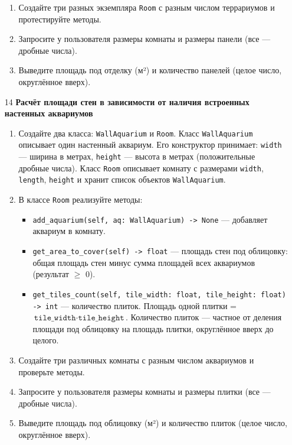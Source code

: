 \begin{enumerate}
\begin{enumerate}
    \item Создайте три разных экземпляра \texttt{Room} с разным числом террариумов и протестируйте методы.

    \item Запросите у пользователя размеры комнаты и размеры панели (все — дробные числа).

    \item Выведите площадь под отделку (м²) и количество панелей (целое число, округлённое вверх).
\end{enumerate}

\item[14] \textbf{Расчёт площади стен в зависимости от наличия встроенных настенных аквариумов}
\begin{enumerate}
    \item Создайте два класса: \texttt{WallAquarium} и \texttt{Room}.  
    Класс \texttt{WallAquarium} описывает один настенный аквариум. Его конструктор принимает:  
    \texttt{width} — ширина в метрах,  
    \texttt{height} — высота в метрах (положительные дробные числа).  
    Класс \texttt{Room} описывает комнату с размерами \texttt{width}, \texttt{length}, \texttt{height} и хранит список объектов \texttt{WallAquarium}.

    \item В классе \texttt{Room} реализуйте методы:  
    \begin{itemize}
        \item \texttt{add\_aquarium(self, aq: WallAquarium) -> None} — добавляет аквариум в комнату.
        \item \texttt{get\_area\_to\_cover(self) -> float} — площадь стен под облицовку: общая площадь стен минус сумма площадей всех аквариумов (результат $\geqslant$ 0).
        \item \texttt{get\_tiles\_count(self, tile\_width: float, tile\_height: float) -> int} — количество плиток. Площадь одной плитки = \(\texttt{tile\_width} \cdot \texttt{tile\_height}\). Количество плиток — частное от деления площади под облицовку на площадь плитки, округлённое вверх до целого.
    \end{itemize}

    \item Создайте три различных комнаты с разным числом аквариумов и проверьте методы.

    \item Запросите у пользователя размеры комнаты и размеры плитки (все — дробные числа).

    \item Выведите площадь под облицовку (м²) и количество плиток (целое число, округлённое вверх).
\end{enumerate}


\end{enumerate}
